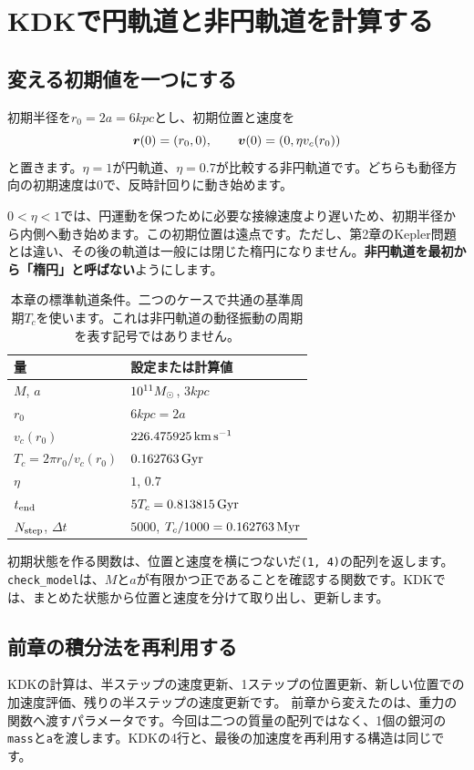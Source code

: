 \section{KDKで円軌道と非円軌道を計算する}
\label{sec:ch3-kdk}
\subsection{変える初期値を一つにする}
初期半径を$r_0=2a=6\unit{kpc}$とし、初期位置と速度を
\begin{equation}
 \boldsymbol r(0)=(r_0,0),\qquad \boldsymbol v(0)=(0,\eta v_c(r_0))
 \label{eq:ch3-initial}
\end{equation}
と置きます。$\eta=1$が円軌道、$\eta=0.7$が比較する非円軌道です。どちらも動径方向の初期速度は0で、反時計回りに動き始めます。

$0<\eta<1$では、円運動を保つために必要な接線速度より遅いため、初期半径から内側へ動き始めます。この初期位置は遠点です。ただし、第2章のKepler問題とは違い、その後の軌道は一般には閉じた楕円になりません。\textbf{非円軌道を最初から「楕円」と呼ばない}ようにします。

\begin{table}[htbp]
\centering
\caption{本章の標準軌道条件。二つのケースで共通の基準周期$T_c$を使います。これは非円軌道の動径振動の周期を表す記号ではありません。}
\label{tab:ch3-parameters}
\begin{tabular}{ll}\toprule
量 & 設定または計算値\\\midrule
$M$, $a$ & $10^{11}M_\odot$, $3\unit{kpc}$\\
$r_0$ & $6\unit{kpc}=2a$\\
$v_c(r_0)$ & $226.475925\,\mathrm{km\,s^{-1}}$\\
$T_c=2\pi r_0/v_c(r_0)$ & $0.162763\,\mathrm{Gyr}$\\
$\eta$ & $1$, $0.7$\\
$t_{\rm end}$ & $5T_c=0.813815\,\mathrm{Gyr}$\\
$N_{\rm step}$, $\Delta t$ & $5000$, $T_c/1000=0.162763\,\mathrm{Myr}$\\\bottomrule
\end{tabular}
\end{table}

初期状態を作る関数は、位置と速度を横につないだ\texttt{(1, 4)}の配列を返します。
\texttt{check\_model}は、$M$と$a$が有限かつ正であることを確認する関数です。KDKでは、まとめた状態から位置と速度を分けて取り出し、更新します。

\subsection{前章の積分法を再利用する}
KDKの計算は、半ステップの速度更新、1ステップの位置更新、新しい位置での加速度評価、残りの半ステップの速度更新です。
前章から変えたのは、重力の関数へ渡すパラメータです。今回は二つの質量の配列ではなく、1個の銀河の\texttt{mass}と\texttt{a}を渡します。KDKの4行と、最後の加速度を再利用する構造は同じです。

